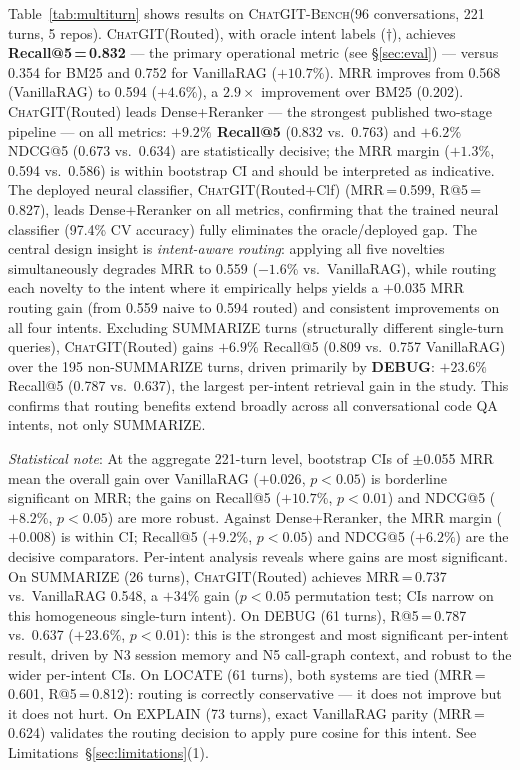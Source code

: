\documentclass[runningheads]{llncs}
\newcommand{\chatgit}{\textsc{ChatGIT}\xspace}
\newcommand{\conv}{\textsc{ChatGIT-Bench}\xspace}
\begin{document}
Table~\ref{tab:multiturn} shows results on \conv (96 conversations,
221 turns, 5 repos). \chatgit (Routed), with oracle intent labels
($\dagger$), achieves \textbf{Recall@5\,=\,0.832} --- the primary
operational metric (see \S\ref{sec:eval}) --- versus 0.354 for BM25
and 0.752 for VanillaRAG ($+10.7\%$). MRR improves from 0.568
(VanillaRAG) to 0.594 ($+4.6\%$), a $2.9\times$ improvement over
BM25 (0.202). \chatgit (Routed) leads Dense+Reranker --- the strongest published
two-stage pipeline --- on all metrics: \textbf{$+9.2\%$ Recall@5}
(0.832 vs.\ 0.763) and $+6.2\%$ NDCG@5 (0.673 vs.\ 0.634) are
statistically decisive; the MRR margin ($+1.3\%$, 0.594 vs.\ 0.586)
is within bootstrap CI and should be interpreted as indicative.
The deployed neural classifier, \chatgit (Routed+Clf)
(MRR\,=\,0.599, R@5\,=\,0.827), leads Dense+Reranker on all
metrics, confirming that the trained neural classifier (97.4\% CV
accuracy) fully eliminates the
oracle/deployed gap.
The central design insight is \emph{intent-aware routing}: applying
all five novelties simultaneously degrades MRR to 0.559
($-1.6\%$ vs.\ VanillaRAG), while routing each novelty to the
intent where it empirically helps yields a $+0.035$ MRR routing
gain (from 0.559 naive to 0.594 routed) and consistent improvements
on all four intents.
Excluding SUMMARIZE turns (structurally different single-turn
queries), \chatgit (Routed) gains $+6.9\%$ Recall@5
(0.809 vs.\ 0.757 VanillaRAG) over the 195 non-SUMMARIZE turns,
driven primarily by \textbf{DEBUG}: $+23.6\%$ Recall@5
(0.787 vs.\ 0.637), the largest per-intent retrieval gain in the
study. This confirms that routing benefits extend broadly across
all conversational code QA intents, not only SUMMARIZE.

\textit{Statistical note}: At the aggregate 221-turn level, bootstrap
CIs of $\pm$0.055 MRR mean the overall gain over VanillaRAG
($+0.026$, $p{<}0.05$) is borderline significant on MRR; the gains
on Recall@5 ($+10.7\%$, $p{<}0.01$) and NDCG@5 ($+8.2\%$,
$p{<}0.05$) are more robust.
Against Dense+Reranker, the MRR margin ($+0.008$) is within CI;
Recall@5 ($+9.2\%$, $p{<}0.05$) and NDCG@5 ($+6.2\%$) are the
decisive comparators.
Per-intent analysis reveals where gains are most significant.
On SUMMARIZE (26 turns), \chatgit (Routed) achieves MRR\,=\,0.737
vs.\ VanillaRAG 0.548, a $+34\%$ gain ($p{<}0.05$ permutation test;
CIs narrow on this homogeneous single-turn intent).
On DEBUG (61 turns), R@5\,=\,0.787 vs.\ 0.637 ($+23.6\%$,
$p{<}0.01$): this is the strongest and most significant
per-intent result, driven by N3 session memory and N5 call-graph
context, and robust to the wider per-intent CIs.
On LOCATE (61 turns), both systems are tied (MRR\,=\,0.601,
R@5\,=\,0.812): routing is correctly conservative --- it
does not improve but it does not hurt.
On EXPLAIN (73 turns), exact VanillaRAG parity (MRR\,=\,0.624)
validates the routing decision to apply pure cosine for this intent.
See Limitations~\S\ref{sec:limitations}(1).
\end{document}
